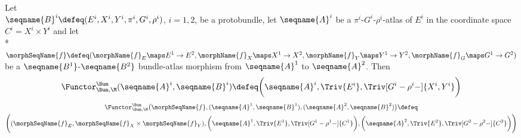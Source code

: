 \documentclass{article}
\begin{document}
\begin{definition}
\label{def:FuncBuntoM}
Let \\
$
  \seqname{B}^i
  \defeq
  (
    E^i,
    X^i,
    Y^i,
    \pi^i,
    G^i,
    \rho^i
  )
$,
$i=1,2$, be a protobundle, let $\seqname{A}^i$ be a
$\pi^i$-$G^i$-$\rho^i$-atlas of $E^i$ in the coordinate space
$C^i = X^i \times Y^i$ and let \\*
$
  \morphSeqName{f}
  \defeq
  (
    \morphName{f}_E \maps E^1 \to E^2,
    \morphName{f}_X \maps X^1 \to X^2,
    \morphName{f}_Y \maps Y^1 \to Y^2,
    \morphName{f}_G \maps G^1 \to G^2
  )
$
be a $\seqname{B^1}$-$\seqname{B^2}$ bundle-atlas morphism from
$\seqname{A}^1$ to $\seqname{A}^2$. Then
\begin{equation}
\Functor^\Bun_{\Bun,\M} (\seqname{A}^i, \seqname{B}^i)
\defeq
\biggl ( \seqname{A}^i, \Triv{E^i}, \Triv[G^i-\rho^i-]{X^i,Y^i} \biggr )
\end{equation}
\begin{multline}
\Functor^\Bun_{\Bun,\M}
  \bigl (
    \morphSeqName{f},
    (\seqname{A}^1, \seqname{B}^1),
    (\seqname{A}^2, \seqname{B}^2)
  \bigr )
\defeq \\
  \Biggl (
    (\morphSeqName{f}_E, \morphSeqName{f}_X \times \morphSeqName{f}_Y),
    \biggl ( \seqname{A}^1, \Triv{E^1}, \Triv[G^1-\rho^1-]{C^1} \biggr ),
    \biggl ( \seqname{A}^2, \Triv{E^2}, \Triv[G^2-\rho^2-]{C^2} \biggr )
  \Biggr )
\end{multline}
\end{definition}
\end{document}
